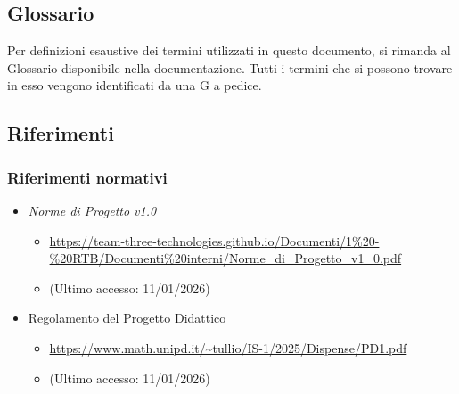 \documentclass[a4paper,12pt]{article}
\begin{document}
    \subsection{Glossario}
        Per definizioni esaustive dei termini utilizzati in questo documento, si rimanda al Glossario disponibile nella documentazione. Tutti i termini che si possono trovare in esso vengono identificati da una G a pedice.
    \subsection{Riferimenti}
        \subsubsection{Riferimenti normativi}
            \begin{itemize}
                \item \textit{Norme di Progetto v1.0}
                \begin{itemize}
                    \item \url{https://team-three-technologies.github.io/Documenti/1%20-%20RTB/Documenti%20interni/Norme_di_Progetto_v1_0.pdf}
                    \item[] (Ultimo accesso: 11/01/2026)
                \end{itemize}
                \item Regolamento del Progetto Didattico
                \begin{itemize}
                    \item \url{https://www.math.unipd.it/~tullio/IS-1/2025/Dispense/PD1.pdf}
                    \item[] (Ultimo accesso: 11/01/2026)
                \end{itemize}
            \end{itemize}
\end{document}

